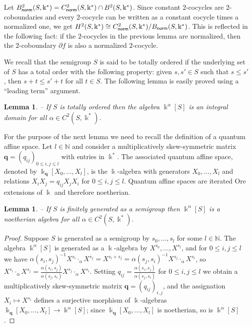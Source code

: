 \documentclass[twoside,11pt]{article}
\newcommand{\norm}{{\sf norm}}
\renewcommand{\k}{\Bbbk}
\newcommand{\N}{{\mathbb N}}
\newcommand{\q}{{\mathbf q}}
\newtheorem{sublemma}[subtheorem]{Lemma}
\begin{document}
Let $B^2_{\norm}(S,\k^*) = C^2_{\norm}(S,\k^*) \cap B^2(S,\k^*)$. Since constant
$2$-cocycles are $2$-coboundaries and every $2$-cocycle can be written as a constant
cocycle times a normalized one, we get $H^2(S, \k^*) \cong C_\norm^2(S, \k^*) / B_\norm(S,
\k^*)$. This is reflected in the following fact: if the $2$-cocycles in the previous lemma
are normalized, then the $2$-coboundary $\partial f$ is also a normalized $2$-cocycle.

We recall that the semigroup $S$ is said to be totally ordered if the underlying set of
$S$ has a total order with the following property: given $s, s' \in S$ such that $s
\leq s'$, then $s + t \leq s' + t$ for all $t \in S$. The following lemma is easily
proved using a ``leading term'' argument.

\begin{sublemma} -- \label{integral-domain} If $S$ is totally ordered then the algebra
$\k^\alpha[S]$ is an integral domain for all $\alpha \in C^2(S,\k^*)$.
\end{sublemma} 

For the purpose of the next lemma we need to recall the definition of a quantum affine
space. Let $l\in\N$ and consider a multiplicatively skew-symmetric matrix
$\q=(q_{ij})_{0\leq i,j \leq l}$ with entries in $\k^*$. The associated quantum affine 
space, denoted by $\k_\q[X_0,\dots,X_l]$, is the $\k$-algebra with generators
$X_0,\dots,X_l$ and relations $X_iX_j=q_{ij}X_jX_i$ for $0 \leq i,j \leq l$. Quantum
affine spaces are iterated Ore extensions of $\k$ and therefore noetherian.

\begin{sublemma} -- \label{noetherian}
If $S$ is finitely generated as a semigroup then $\k^\alpha[S]$ is a noetherian algebra
for all $\alpha \in C^2(S,\k^*)$.
\end{sublemma}

\begin{proof} Suppose $S$ is generated as a semigroup by $s_0, \ldots, s_l$ for some $l\in\N$.
The algebra $\k^\alpha[S]$ is generated as a $\k$-algebra by $X^{s_0},\dots,X^{s_l}$, and
for $0 \leq i,j \leq l$ we have $\alpha(s_i,s_j)^{-1} X^{s_i} \cdot_\alpha X^{s_j} =
X^{s_i+s_j} = \alpha(s_j,s_i)^{-1} X^{s_j} \cdot_\alpha X^{s_i}$, so $X^{s_i} \cdot_\alpha
X^{s_j} = \frac{\alpha(s_i, s_j)}{\alpha(s_j, s_i)} X^{s_j} \cdot_\alpha X^{s_i}$. Setting
$q_{ij} = \frac{\alpha(s_i, s_j)}{\alpha(s_j, s_i)}$ for $0 \leq i,j \leq l$ we obtain a
multiplicatively skew-symmetric matrix $\q=(q_{ij})_{i,j}$, and the assignation $X_i
\mapsto X^{s_i}$ defines a surjective morphism of $\k$-algebras $\k_\q[X_0,\dots,X_l]
\longrightarrow \k^\alpha[S]$; since $\k_\q[X_0, \ldots, X_l]$ is noetherian, so is
$\k^\alpha[S]$. \end{proof}
\end{document}
